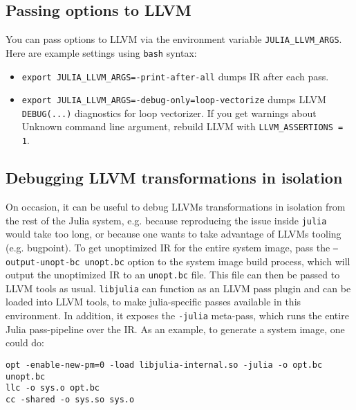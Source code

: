\hypertarget{3429896864083237221}{}


\subsection{Passing options to LLVM}



You can pass options to LLVM via the environment variable \texttt{JULIA\_LLVM\_ARGS}. Here are example settings using \texttt{bash} syntax:



\begin{itemize}
\item \texttt{export JULIA\_LLVM\_ARGS=-print-after-all} dumps IR after each pass.


\item \texttt{export JULIA\_LLVM\_ARGS=-debug-only=loop-vectorize} dumps LLVM \texttt{DEBUG(...)} diagnostics for loop vectorizer. If you get warnings about {\textquotedbl}Unknown command line argument{\textquotedbl}, rebuild LLVM with \texttt{LLVM\_ASSERTIONS = 1}.

\end{itemize}


\hypertarget{7270369944062365114}{}


\subsection{Debugging LLVM transformations in isolation}



On occasion, it can be useful to debug LLVM{\textquotesingle}s transformations in isolation from the rest of the Julia system, e.g. because reproducing the issue inside \texttt{julia} would take too long, or because one wants to take advantage of LLVM{\textquotesingle}s tooling (e.g. bugpoint). To get unoptimized IR for the entire system image, pass the \texttt{--output-unopt-bc unopt.bc} option to the system image build process, which will output the unoptimized IR to an \texttt{unopt.bc} file. This file can then be passed to LLVM tools as usual. \texttt{libjulia} can function as an LLVM pass plugin and can be loaded into LLVM tools, to make julia-specific passes available in this environment. In addition, it exposes the \texttt{-julia} meta-pass, which runs the entire Julia pass-pipeline over the IR. As an example, to generate a system image, one could do:




\begin{lstlisting}
opt -enable-new-pm=0 -load libjulia-internal.so -julia -o opt.bc unopt.bc
llc -o sys.o opt.bc
cc -shared -o sys.so sys.o
\end{lstlisting}



